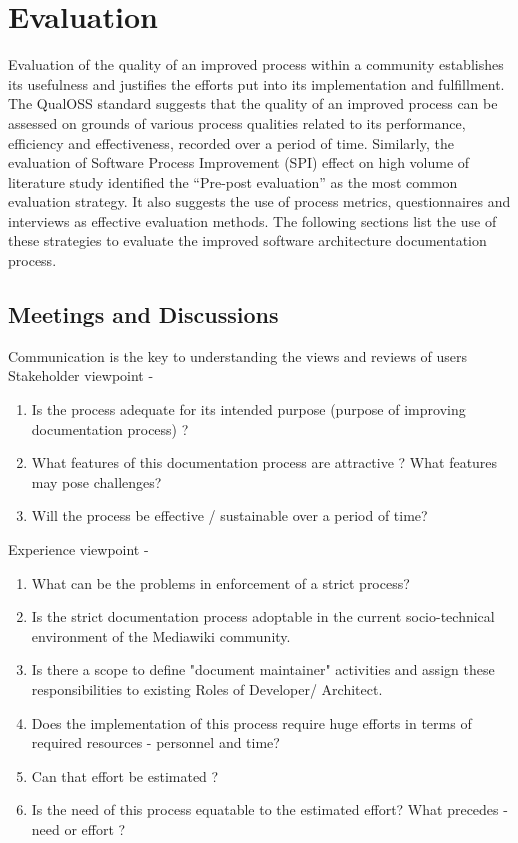\chapter{Evaluation}\label{chapter:Evaluation}
\indent Evaluation of the quality of an improved process within a community establishes its usefulness and justifies the efforts put into its implementation and fulfillment.
\\\indent The QualOSS standard \cite{Shahin2014} suggests that the quality of an improved process can be assessed on grounds of various process qualities related to its performance, efficiency and effectiveness, recorded over a period of time. Similarly, the evaluation of Software Process Improvement (SPI) \cite{Unterkalmsteiner2011} effect on high volume of literature study identified the \enquote{Pre-post evaluation} as the most common evaluation strategy.  It also suggests the use of process metrics, questionnaires and interviews as effective evaluation methods. The following sections list the use of these strategies to evaluate the improved software architecture documentation process.

\section{Meetings and Discussions}
\indent Communication is the key to understanding the views and reviews of users
Stakeholder viewpoint - 
\begin{enumerate}
\item Is the process adequate for its intended purpose (purpose of improving documentation process) ?
\item What features of this documentation process are attractive ? What features may pose challenges?
\item Will the process be effective / sustainable over a period of time?
\end{enumerate}

Experience viewpoint -
\begin{enumerate}
\item What can be the problems in enforcement of a strict process?
\item Is the strict documentation process adoptable in the current socio-technical environment of the Mediawiki community.
\item Is there a scope to define "document maintainer" activities and assign these responsibilities to existing Roles of Developer/ Architect. 
\item Does the implementation of this process require huge efforts in terms of required resources - personnel and time? 
\item Can that effort be estimated ?
\item Is the need of this process equatable to the estimated effort? What precedes - need or effort ?
\end{enumerate}


